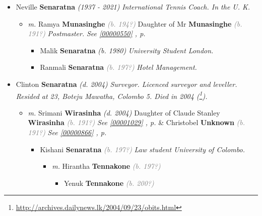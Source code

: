 \documentclass[10pt, openany]{book}
\begin{document}
\begin{itemize}
{\begin{itemize}
{ }
\item{Neville \textbf{Senaratna} \textcolor{slorange}{\textit{(1937 - 2021)}} \textcolor{slmaroon}{\textit{International Tennis Coach.
In the U. K.}}
\begin{itemize}
\item{\textit{m.} Ramya \textbf{Munasinghe} \textcolor{gray}{\textit{(b. 194?)}} Daughter of  Mr \textbf{Munasinghe} \textcolor{gray}{\textit{(b. 191?)}} \textcolor{slmaroon}{\textit{Postmaster.}} \textcolor{slteal}{\textit{See  \autoref{00000550} \textit{, p. \pageref{00000550} }}}   \label{couple:00000552:00000756} \begin{itemize}
\item{Malik \textbf{Senaratna} \textcolor{slorange}{\textit{(b. 1980)}} \textcolor{slmaroon}{\textit{University Student London.}}
 }
\item{Ranmali \textbf{Senaratna} \textcolor{gray}{\textit{(b. 197?)}} \textcolor{slmaroon}{\textit{Hotel Management.}}
 }
\end{itemize}}
\end{itemize}
 }
\item{Clinton \textbf{Senaratna} \textcolor{slorange}{\textit{(d. 2004)}} \textcolor{slmaroon}{\textit{Surveyor.
Licenced surveyor and leveller.
Resided at 23, Boteju Mawatha, Colombo 5.
Died in 2004 (\footnote{\url{http://archives.dailynews.lk/2004/09/23/obits.html}}).}}
\begin{itemize}
\item{\textit{m.} Srimani \textbf{Wirasinha} \textcolor{slorange}{\textit{(d. 2004)}} Daughter of  Claude Stanley \textbf{Wirasinha} \textcolor{gray}{\textit{(b. 191?)}} \textcolor{slteal}{\textit{See  \autoref{00001029} \textit{, p. \pageref{00001029} }}}  \&  Christobel \textbf{Unknown} \textcolor{gray}{\textit{(b. 191?)}} \textcolor{slteal}{\textit{See  \autoref{00000866} \textit{, p. \pageref{00000866} }}}   \label{couple:00000718:00001030} \begin{itemize}
\item{Kishani \textbf{Senaratna} \textcolor{gray}{\textit{(b. 197?)}} \textcolor{slmaroon}{\textit{Law student University of Colombo.}}
\begin{itemize}
\item{\textit{m.} Hirantha \textbf{Tennakone} \textcolor{gray}{\textit{(b. 197?)}}   \label{couple:00000741:00000853} \begin{itemize}
\item{Yenuk \textbf{Tennakone} \textcolor{gray}{\textit{(b. 200?)}}
}
\end{itemize}}
\end{itemize}}
\end{itemize}}
\end{itemize}}
\end{itemize}}
\end{itemize}
\end{document}
